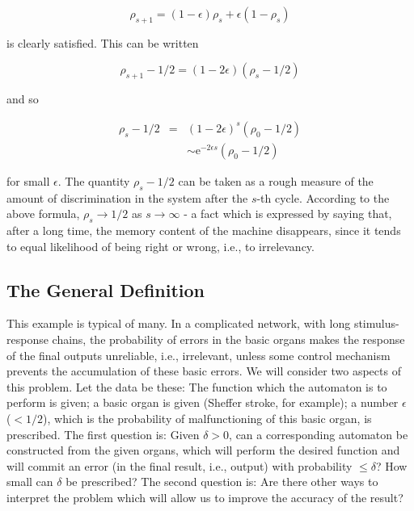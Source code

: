 \documentclass[twocolumn,preprintnumbers,amsmath,amssymb,floatfix]{revtex4}
\begin{document}
\begin{equation*}
\rho_{s+1}=(1-\epsilon)\rho_s+\epsilon(1-\rho_s)
\end{equation*}

\noindent is clearly satisfied. This can be written

\begin{equation*}
\rho_{s+1}-1/2=(1-2\epsilon)(\rho_s-1/2)
\end{equation*}

\noindent and so

\begin{eqnarray}
\rho_s-1/2 & = & (1-2\epsilon)^s(\rho_0-1/2)\\
           &   & \sim \mathrm{e}^{-2\epsilon s}(\rho_0-1/2) \label{eq:8}
\end{eqnarray}

\noindent for small $\epsilon$. The quantity $\rho_s-1/2$ can be
taken as a rough measure of the amount of discrimination in the
system after the $s$-th cycle. According to the above formula,
$\rho_s\rightarrow1/2$ as $s\rightarrow \infty$ - a fact which is
expressed by saying that, after a long time, the memory content of
the machine disappears, since it tends to equal likelihood of
being right or wrong, i.e., to irrelevancy.

\subsection{\label{sec:seven2}The General Definition}

This example is typical of many. In a complicated network, with
long stimulus-response chains, the probability of errors in the
basic organs makes the response of the final outputs unreliable,
i.e., irrelevant, unless some control mechanism prevents the
accumulation of these basic errors. We will consider two aspects
of this problem. Let the data be these: The function which the
automaton is to perform is given; a basic organ is given (Sheffer
stroke, for example); a number $\epsilon$ ($<1/2$), which is the
probability of malfunctioning of this basic organ, is prescribed.
The first question is: Given $\delta>0$, can a corresponding
automaton be constructed from the given organs, which will perform
the desired function and will commit an error (in the final
result, i.e., output) with probability $\leq\delta$? How small can
$\delta$ be prescribed? The second question is: Are there other
ways to interpret the problem which will allow us to improve the
accuracy of the result?
\end{document}
